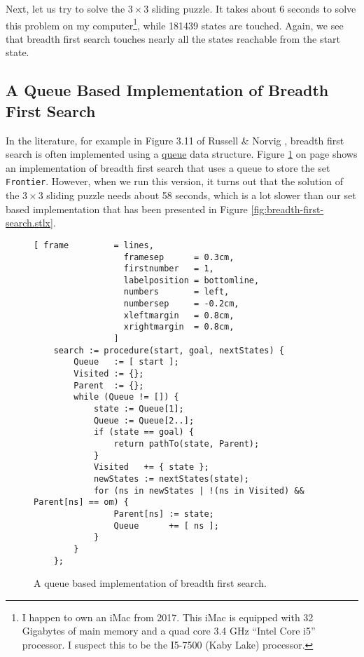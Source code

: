 Next, let us try to solve the $3 \times 3$ sliding puzzle.  It takes about 6 seconds to solve
this problem on my computer\footnote{
  I happen to own an iMac from 2017.  This iMac is equipped with 32 Gigabytes of main memory and a
  quad core 3.4 GHz ``Intel Core i5'' processor.  I suspect this to be the I5-7500 (Kaby Lake) processor.
}, while 181439 states are touched.  Again, we see that breadth first search touches nearly all the
states reachable from the start state.

\subsection{A Queue Based Implementation of Breadth First Search}
In the literature, for example in Figure 3.11 of Russell \& Norvig \cite{russell:2009}, breadth
first search is often implemented using a
\href{https://en.wikipedia.org/wiki/Queue_(abstract_data_type)}{queue} data structure.  
Figure \ref{fig:breadth-first-search-queue.stlx} on page
\pageref{fig:breadth-first-search-queue.stlx} shows an implementation of breadth first search that
uses a queue to store the set \texttt{Frontier}.  However, when we run this version, it turns out
that the solution of the $3 \times 3$ sliding puzzle needs about 58 seconds, which is a lot
slower than our set based implementation that has been presented in Figure
\ref{fig:breadth-first-search.stlx}.

\begin{figure}[!ht]
\centering
\begin{Verbatim}[ frame         = lines, 
                  framesep      = 0.3cm, 
                  firstnumber   = 1,
                  labelposition = bottomline,
                  numbers       = left,
                  numbersep     = -0.2cm,
                  xleftmargin   = 0.8cm,
                  xrightmargin  = 0.8cm,
                ]
    search := procedure(start, goal, nextStates) {
        Queue   := [ start ];
        Visited := {}; 
        Parent  := {};
        while (Queue != []) {
            state := Queue[1];
            Queue := Queue[2..];
            if (state == goal) {
                return pathTo(state, Parent);
            }
            Visited   += { state };
            newStates := nextStates(state);
            for (ns in newStates | !(ns in Visited) && Parent[ns] == om) { 
                Parent[ns] := state;
                Queue      += [ ns ];
            }
        }
    };
\end{Verbatim}
\vspace*{-0.3cm}
\caption{A queue based implementation of breadth first search.}
\label{fig:breadth-first-search-queue.stlx}
\end{figure}

